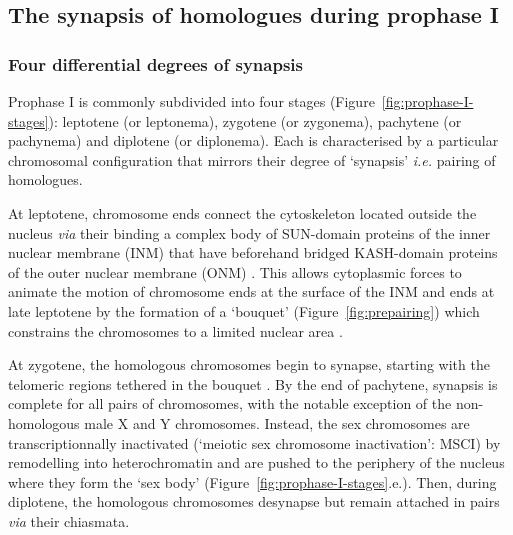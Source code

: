 \subsection{The synapsis of homologues during prophase I}
\label{chap2:prophase-I}

\subsubsection{Four differential degrees of synapsis}
Prophase I is commonly subdivided into four stages (Figure~\ref{fig:prophase-I-stages}): leptotene (or leptonema), zygotene (or zygonema), pachytene (or pachynema) and diplotene (or diplonema).
Each is characterised by a particular chromosomal configuration that mirrors their degree of ‘synapsis’ \textit{i.e.} pairing of homologues.

At leptotene, chromosome ends connect the cytoskeleton located outside the nucleus \citep{scherthan1996centromere} \textit{via} their binding a complex body of SUN-domain proteins of the inner nuclear membrane (INM) that have beforehand bridged KASH-domain proteins of the outer nuclear membrane (ONM) \citep{tzur2006sun, yanowitz2010meiosis}.
This allows cytoplasmic forces to animate the motion of chromosome ends at the surface of the INM \citep{penkner2009meiotic} and ends at late leptotene by the formation of a ‘bouquet’ (Figure~\ref{fig:prepairing}) \citep{zickler1998leptotene} which constrains the chromosomes to a limited nuclear area \citep{zickler2006early}.

At zygotene, the homologous chromosomes begin to synapse, starting with the telomeric regions tethered in the bouquet \citep{pfeifer2003sex}.
By the end of pachytene, synapsis is complete for all pairs of chromosomes, with the notable exception of the non-homologous male X and Y chromosomes.
Instead, the sex chromosomes are transcriptionnally inactivated (‘meiotic sex chromosome inactivation’: MSCI) by remodelling into heterochromatin \citep{fernandez2003h2ax} and are pushed to the periphery of the nucleus where they form the ‘sex body’ \citep{handel2004xy} (Figure~\ref{fig:prophase-I-stages}.e.).
Then, during diplotene, the homologous chromosomes desynapse but remain attached in pairs \textit{via} their chiasmata.


